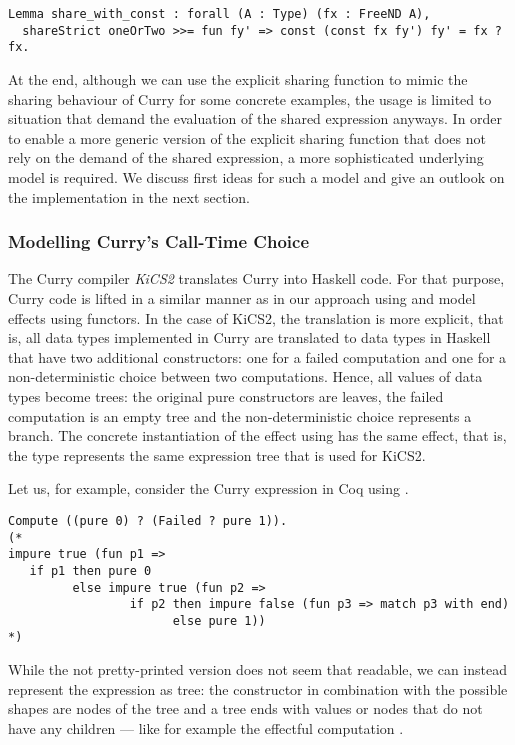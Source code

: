 \begin{verbatim}
Lemma share_with_const : forall (A : Type) (fx : FreeND A),
  shareStrict oneOrTwo >>= fun fy' => const (const fx fy') fy' = fx ? fx.
\end{verbatim}

At the end, although we can use the explicit sharing function  to mimic the sharing behaviour of Curry for some concrete examples, the usage is limited to situation that demand the evaluation of the shared expression anyways.
In order to enable a more generic version of the explicit sharing function that does not rely on the demand of the shared expression, a more sophisticated underlying model is required.
We discuss first ideas for such a model and give an outlook on the implementation in the next section.

\subsubsection{Modelling Curry's Call-Time Choice}

The Curry compiler \emph{KiCS2} translates Curry into Haskell code.
For that purpose, Curry code is lifted in a similar manner as in our approach using  and model effects using functors.
In the case of KiCS2, the translation is more explicit, that is, all data types implemented in Curry are translated to data types in Haskell that have two additional constructors: one for a failed computation and one for a non-deterministic choice between two computations.
Hence, all values of data types become trees: the original pure constructors are leaves, the failed computation is an empty tree and the non-deterministic choice represents a branch.
The concrete instantiation of the effect using  has the same effect, that is, the type  represents the same expression tree that is used for KiCS2.

Let us, for example, consider the Curry expression  in Coq using .

\begin{verbatim}
Compute ((pure 0) ? (Failed ? pure 1)).
(*
impure true (fun p1 =>
   if p1 then pure 0
         else impure true (fun p2 =>
                 if p2 then impure false (fun p3 => match p3 with end)
                       else pure 1))
*)
\end{verbatim}

While the not pretty-printed version does not seem that readable, we can instead represent the expression as tree: the constructor  in combination with the possible shapes are nodes of the tree and a tree ends with  values or nodes that do not have any children --- like for example the effectful computation .

